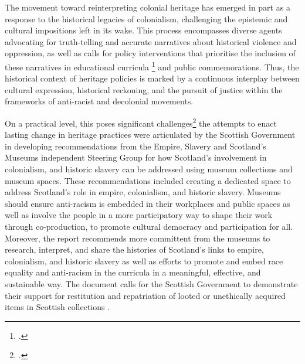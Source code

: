 \documentclass{scrartcl}
\renewcommand{\cite}{\parencite}
\begin{document}
 The movement toward reinterpreting colonial heritage has emerged in part as a response to the historical legacies of colonialism, challenging the epistemic and cultural impositions left in its wake. This process encompasses diverse agents advocating for truth-telling and accurate narratives about historical violence and oppression, as well as calls for policy interventions that prioritise the inclusion of these narratives in educational curricula \footcite[``(...) a consciousness that literature is a powerful instrument in evolving the cultural ethos of a people. They see literature as part of the whole ideological mechanism for integrating a people into the values of a dominant class, race,. nor nation. Imperialism -- particularly during colonialism -- provides the best example of how literature as an element of culture was used in the domination of Africa''][p.99]{ngugi_wa_thiongo_decolonising_1994} and public commemorations. Thus, the historical context of heritage policies is marked by a continuous interplay between cultural expression, historical reckoning, and the pursuit of justice within the frameworks of anti-racist and decolonial movements.
 
On a practical level, this poses significant challenges\footcite["Decolonising is not just about giving stuff back and doing more stuff for/with marginalised people–or being the host and venue for exciting webinars. It’s about committing to letting go of power and control and actively seeking ways to share them, whether decision-making or money or space or skills. We seek to dismantle processes that squeeze out human experiences and impact and systems which perpetuate the privilege of one over the other." ][]{tehmina_goskar_ethics_2020} the attempts to enact lasting change in heritage practices were articulated by the Scottish Government in developing recommendations from the Empire, Slavery and Scotland’s Museums independent Steering Group for how Scotland’s involvement in colonialism, and historic slavery can be addressed using museum collections and museum spaces. These recommendations included  creating a dedicated space to address Scotland's role in empire, colonialism, and historic slavery.  Museums should ensure anti-racism is embedded in their workplaces and public spaces as well as involve the people in a more participatory way to shape their work through co-production, to promote cultural democracy and participation for all. Moreover, the report recommends more committent from the museums to research, interpret, and share the histories of Scotland’s links to empire, colonialism, and historic slavery as well as efforts to promote and embed race equality and anti-racism in the curricula in a meaningful, effective, and sustainable way. The document calls for the Scottish Government to demonstrate their support for restitution and repatriation of looted or unethically acquired items in Scottish collections \cite{essm_steering_group_empire_2022}.
\end{document}
